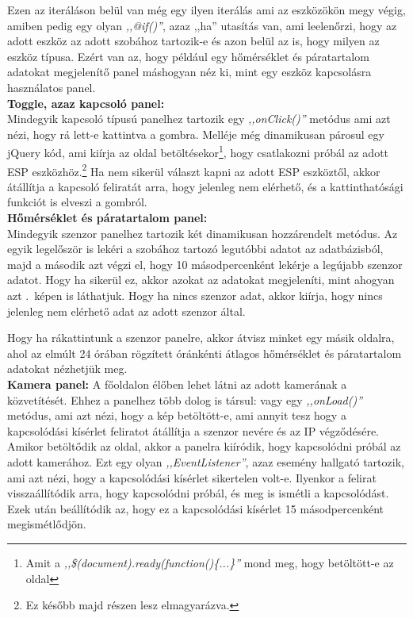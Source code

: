 \documentclass[
]{thesis-ekf}
\theoremstyle{definition}
\theoremstyle{remark}
\begin{document}
	Ezen az iteráláson belül van még egy ilyen iterálás ami az eszközökön megy végig, amiben pedig egy olyan \emph{,,@if()''}, azaz ,,ha'' utasítás van, ami leelenőrzi, hogy az adott eszköz az adott szobához tartozik-e és azon belül az is, hogy milyen az eszköz típusa. Ezért van az, hogy például egy hőmérséklet és páratartalom adatokat megjelenítő panel máshogyan néz ki, mint egy eszköz kapcsolásra használatos panel.
	\\
	\textbf{Toggle, azaz kapcsoló panel:}
	\\
	Mindegyik kapcsoló típusú panelhez tartozik egy \emph{,,onClick()''} metódus ami azt nézi, hogy rá lett-e kattintva a gombra. Melléje még dinamikusan párosul egy jQuery kód, ami kiírja az oldal betöltésekor\footnote{\label{document-ready} Amit a \emph{,,\$(document).ready(function()\{...\}''} mond meg, hogy betöltött-e az oldal}, hogy csatlakozni próbál az adott ESP eszközhöz.\footnote{Ez később majd  részen lesz elmagyarázva.} Ha nem sikerül választ kapni az adott ESP eszköztől, akkor átállítja a kapcsoló feliratát arra, hogy jelenleg nem elérhető, és a kattinthatósági funkciót is elveszi a gombról.
	\\
	\textbf{Hőmérséklet és páratartalom panel:}
	\\
	Mindegyik szenzor panelhez tartozik két dinamikusan hozzárendelt metódus. Az egyik legelőször is lekéri a szobához tartozó legutóbbi adatot az adatbázisból, majd a második azt végzi el, hogy 10 másodpercenként lekérje a legújabb szenzor adatot. Hogy ha sikerül ez, akkor azokat az adatokat megjeleníti, mint ahogyan azt .~képen is láthatjuk. Hogy ha nincs szenzor adat, akkor kiírja, hogy nincs jelenleg nem elérhető adat az adott szenzor által.
	
	Hogy ha rákattintunk a szenzor panelre, akkor átvisz minket egy másik oldalra, ahol az elmúlt 24 órában rögzített óránkénti átlagos hőmérséklet és páratartalom adatokat nézhetjük meg.
	\\
	\textbf{Kamera panel:}
	A főoldalon élőben lehet látni az adott kamerának a közvetítését. Ehhez a panelhez több dolog is társul: vagy egy \emph{,,onLoad()''} metódus, ami azt nézi, hogy a kép betöltött-e, ami annyit tesz hogy a kapcsolódási kísérlet feliratot átállítja a szenzor nevére és az IP végződésére. Amikor betöltődik az oldal, akkor a panelra kiíródik, hogy kapcsolódni próbál az adott kamerához. Ezt egy olyan \emph{,,EventListener''}, azaz esemény hallgató tartozik, ami azt nézi, hogy a kapcsolódási kísérlet sikertelen volt-e. Ilyenkor a felirat visszaállítódik arra, hogy kapcsolódni próbál, és meg is ismétli a kapcsolódást. Ezek után beállítódik az, hogy ez a kapcsolódási kísérlet 15 másodpercenként megismétlődjön. 
	
\end{document}
